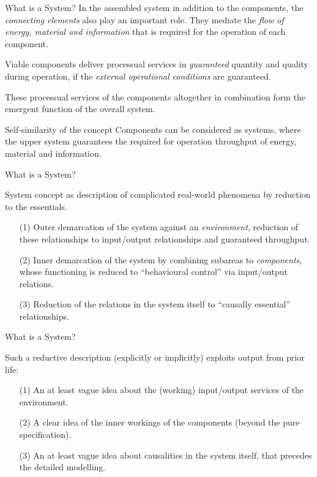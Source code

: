 \documentclass{beamer}
\begin{document}
\begin{frame}{What is a System?}
In the assembled system in addition to the components, the \emph{connecting
  elements} also play an important role.  They mediate the \emph{flow of
  energy, material and information} that is required for the operation of each
component.

\begin{block}{}
  Viable components deliver processual services in \emph{guaranteed} quantity
  and quality during operation, if the \emph{external operational conditions}
  are guaranteed.
\end{block}

These processual services of the components altogether in combination form the
emergent function of the overall system.

\begin{block}{Self-similarity of the concept}
  Components can be considered as systems, where the upper system guarantees
  the required for operation throughput of energy, material and information.
\end{block}
\end{frame}

\begin{frame}{What is a System?}
  \begin{block}{
    System concept as description of complicated real-world phenomena by
    reduction to the essentials.}
    \begin{itemize}
    \item[(1)] Outer demarcation of the system against an \emph{environment},
      reduction of these relationships to input/output relationships and
      guaranteed throughput.
    \item[(2)] Inner demarcation of the system by combining subareas to
      \emph{components}, whose functioning is reduced to “behavioural control” via
      input/output relations.
    \item[(3)] Reduction of the relations in the system itself to “causally
      essential” relationships.
    \end{itemize}
  \end{block}

\end{frame}

\begin{frame}{What is a System?}
  \begin{block}{
    Such a reductive description (explicitly or implicitly) exploits output from
    prior life:}
    \begin{itemize}
    \item[(1)] An at least vague idea about the (working) input/output services of
      the environment.
    \item[(2)] A clear idea of the inner workings of the components (beyond the
      pure specification).
    \item[(3)] An at least vague idea about causalities in the system itself, that
      precedes the detailed modelling.
    \end{itemize}
  \end{block}

\end{frame}
\end{document}
